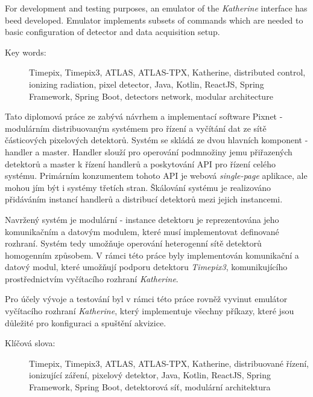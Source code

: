 \documentclass[11pt,twoside,a4paper]{book}
\begin{document}
	For development and testing purposes, an emulator of the \textit{Katherine} interface has beed developed. Emulator implements subsets of commands which are needed to basic configuration of detector and data acquisition setup.

	\vspace*{2cm}
	\begin{description}
		\item[Key words:] Timepix, Timepix3, ATLAS, ATLAS-TPX, Katherine, distributed control, ionizing radiation, pixel detector, Java, Kotlin, ReactJS, Spring Framework, Spring Boot, detectors network, modular architecture
	\end{description}

	\abstractpagecz
	Tato diplomová práce ze zabývá návrhem a implementací software Pixnet - modulárním distribuovaným systémem pro řízení a vyčítání dat ze sítě částicových pixelových detektorů. Systém se skládá ze dvou hlavních komponent - handler a master. Handler slouží pro operování podmnožiny jemu přiřazených detektorů a master k řízení handlerů a poskytování API pro řízení celého systému. Primárním konzumentem tohoto API je webová \textit{single-page} aplikace, ale mohou jím být i systémy třetích stran. Škálování systému je realizováno přidáváním instancí handlerů a distribucí detektorů mezi jejich instancemi.
	
	Navržený systém je modulární - instance detektoru je reprezentována jeho komunikačním a datovým modulem, které musí implementovat definované rozhraní. Systém tedy umožňuje operování heterogenní sítě detektorů homogenním způsobem. V rámci této práce byly implementován komunikační a datový modul, které umožňují podporu detektoru \textit{Timepix3}, komunikujícího prostřednictvím vyčítacího rozhraní \textit{Katherine}.

	Pro účely vývoje a testování byl v rámci této práce rovněž vyvinut emulátor vyčítacího rozhraní \textit{Katherine}, který implementuje všechny příkazy, které jsou důležité pro konfiguraci a spuštění akvizice.

	\vspace*{2cm}
	\begin{description}
		\item[Klíčová slova:] Timepix, Timepix3, ATLAS, ATLAS-TPX, Katherine, distribuované řízení, ionizující záření, pixelový detektor, Java, Kotlin, ReactJS, Spring Framework, Spring Boot, detektorová síť, modulární architektura
	\end{description}
\end{document}
